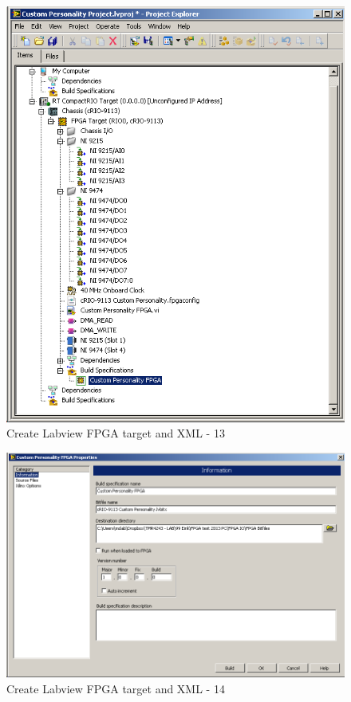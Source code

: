 \begin{figure}[htb!]
	\centering \includegraphics[scale=0.45]{Screenshots/Screenshot_2015-01-16_19-52-25.png}
	\caption{Create Labview FPGA target and XML - 13}
	\label{fig: Create Labview FPGA target and XML-13} 
\end{figure}
\begin{figure}[htb!]
	\centering \includegraphics[scale=0.45]{Screenshots/Screenshot_2015-01-16_19-53-01.png}
	\caption{Create Labview FPGA target and XML - 14}
	\label{fig: Create Labview FPGA target and XML-14} 
\end{figure}
